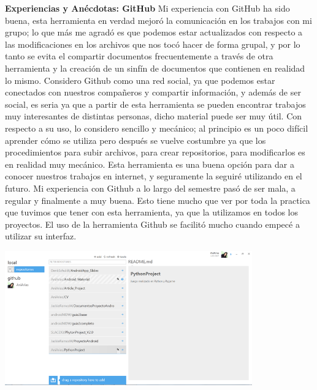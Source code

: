 \documentclass[12pt]{report}
\begin{document}
	\begingroup
		\large{
			\textbf{
			           \newline
			           \newline
				Experiencias y Anécdotas: GitHub
				\newline
				\newline
			}
		}
	\endgroup
Mi experiencia con GitHub ha sido buena, esta herramienta en verdad mejoró la comunicación en los trabajos con mi grupo; lo que más me agradó es que podemos estar actualizados con respecto a las modificaciones en los archivos que nos tocó hacer de forma grupal, y por lo tanto se evita el compartir documentos frecuentemente a través de otra herramienta y la creación de un sinfín de documentos que contienen en realidad lo mismo.
\newline
\newline	
Considero Github como una red social, ya que podemos estar conectados con nuestros compañeros y compartir información, y además de ser social, es seria ya que a partir de esta herramienta se pueden encontrar trabajos muy interesantes de distintas personas, dicho material puede ser muy útil.
\newline
\newline	
Con respecto a su uso, lo considero sencillo y mecánico; al principio es un poco difícil aprender cómo se utiliza pero después se vuelve costumbre ya que los procedimientos para subir archivos, para crear repositorios, para modificarlos es en realidad muy mecánico.
\newline
Esta herramienta es una buena opción para dar a conocer nuestros trabajos en internet, y seguramente la seguiré utilizando en el futuro.
\newline
\newline
Mi experiencia con Github a lo largo del semestre pasó de ser mala, a regular y finalmente a muy buena. Esto tiene mucho que ver por toda la practica que tuvimos que tener con esta herramienta, ya que la utilizamos en todos los proyectos.
El uso de la herramienta Github se facilitó mucho cuando empecé a utilizar su interfaz.
\newline
	\begin{center}
		\begingroup
			\includegraphics[width=0.8\textwidth]{imagenes_usuario/git2.png}
\newline
\newline
		\endgroup
	\end{center}
\end{document}
